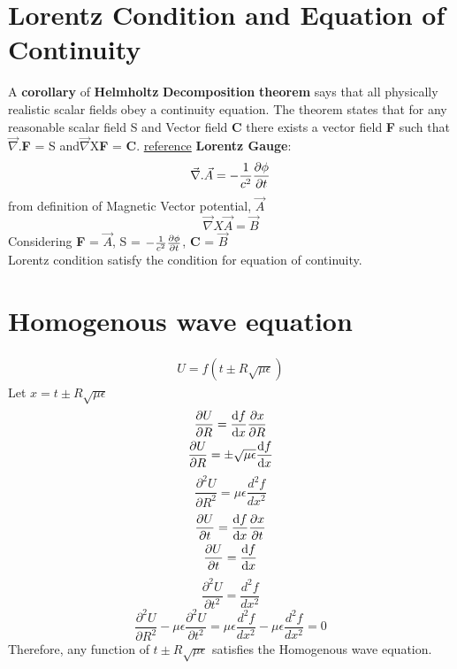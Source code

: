 \documentclass[11pt, a4paper]{article}
\begin{document}
\section{Lorentz Condition and Equation of Continuity}
A \textbf{corollary}  of \textbf{Helmholtz} \textbf{Decomposition} \textbf{theorem} says that all physically realistic scalar fields obey a continuity equation. The theorem states that for any reasonable scalar field S and Vector field \textbf{C}  there exists a vector field \textbf{F} such that \(\vec{\nabla}\).\textbf{F} = S and\(\vec{\nabla}\)X\textbf{F} = \textbf{C}. \href{http://dfcd.net/articles/potentialfields.pdf}{reference}\newline
\textbf{Lorentz Gauge}: 
\begin{gather}
    \vec{\nabla}.\vec{A} = -\frac{1}{c^2}\pdv{\phi}{t}
\end{gather}
from definition  of Magnetic Vector potential, \(\vec{A}\)
\begin{equation}
    \vec{\nabla}X\vec{A} = \vec{B}
\end{equation}
Considering \textbf{F} = $\vec{A}$, S = $-\frac{1}{c^2}\pdv{\phi}{t}$, \textbf{C} = \(\vec{B}\) \\
Lorentz condition satisfy the condition for equation of continuity. 
\section{Homogenous wave equation}
\begin{gather}
    U = f(t \pm R\sqrt{\mu \epsilon } )
\end{gather}
Let \(x = t \pm R\sqrt{\mu \epsilon }\)
\begin{gather}
    \pdv{U}{R} = \odv{f}{x} \pdv{x}{R}\\
    \pdv{U}{R} = \pm\sqrt{\mu \epsilon} \odv{f}{x}
\end{gather}
\begin{equation}
    \boxed{\frac{\partial ^2 U}{\partial R^2} = \mu \epsilon \frac{d^{2}f }{dx^2}}
\end{equation}
\begin{gather}
    \pdv{U}{t} = \odv{f}{x} \pdv{x}{t}\\
    \pdv{U}{t} = \odv{f}{x}
\end{gather}
\begin{equation}
    \boxed{\frac{\partial ^2 U}{\partial t^2} = \frac{d^{2}f }{dx^2}}
\end{equation}
\begin{equation}
    \boxed{\frac{\partial ^2 U}{\partial R^2} -\mu \epsilon \frac{\partial ^2 U}{\partial t^2} = \mu \epsilon \frac{d^{2}f }{dx^2} - \mu \epsilon \frac{d^2 f}{dx^2} = 0}
\end{equation}
Therefore, any function of $t\pm R \sqrt{\mu \epsilon}$ satisfies the Homogenous wave equation.  
\end{document}
